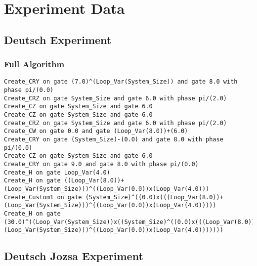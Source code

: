 \chapter{Experiment Data}

\section{Deutsch Experiment}
\label{sec:DeutschExpApp}
\subsection{Full Algorithm}
\label{sec:DeutschExpAppFullAlg}
\lstset{numbers=left,language=Java, breaklines=true}
\begin{lstlisting}
Create_CRY on gate (7.0)^(Loop_Var(System_Size)) and gate 8.0 with phase pi/(0.0)
Create_CRZ on gate System_Size and gate 6.0 with phase pi/(2.0)
Create_CZ on gate System_Size and gate 6.0
Create_CZ on gate System_Size and gate 6.0
Create_CRZ on gate System_Size and gate 6.0 with phase pi/(2.0)
Create_CW on gate 0.0 and gate (Loop_Var(8.0))+(6.0)
Create_CRY on gate (System_Size)-(0.0) and gate 8.0 with phase pi/(0.0)
Create_CZ on gate System_Size and gate 6.0
Create_CRY on gate 9.0 and gate 8.0 with phase pi/(0.0)
Create_H on gate Loop_Var(4.0)
Create_H on gate ((Loop_Var(8.0))+(Loop_Var(System_Size)))^((Loop_Var(0.0))x(Loop_Var(4.0)))
Create_Custom1 on gate (System_Size)^((0.0)x(((Loop_Var(8.0))+(Loop_Var(System_Size)))^((Loop_Var(0.0))x(Loop_Var(4.0)))))
Create_H on gate (30.0)^((Loop_Var(System_Size))x((System_Size)^((0.0)x(((Loop_Var(8.0))+(Loop_Var(System_Size)))^((Loop_Var(0.0))x(Loop_Var(4.0)))))))
\end{lstlisting}

\clearpage
\section{Deutsch Jozsa Experiment}
\label{sec:deutschjozsa}

